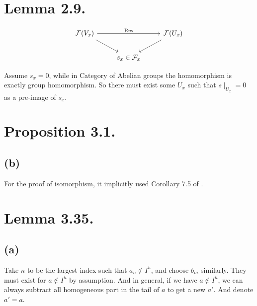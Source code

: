 \section{Lemma 2.9.}

\[\begin{tikzcd}
	{\mathcal F(V_x)} && {\mathcal F(U_x)} \\
	& {s_x\in\mathcal F_x}
	\arrow["{\text{Res}}", from=1-1, to=1-3]
	\arrow[from=1-1, to=2-2]
	\arrow[from=1-3, to=2-2]
\end{tikzcd}\]

Assume $s_x=0$, while in Category of Abelian groups the homomorphism is exactly group homomorphism. So there must exist some $U_x$ such that $s\mid_{U_x}=0$ as a pre-image of $s_x$.

\section{Proposition 3.1.}

\subsection{(b)}

For the proof of isomorphism, it implicitly used Corollary 7.5 of \cite{atiyah1994introduction}.

\section{Lemma 3.35.}

\subsection{(a)}

Take $n$ to be the largest index such that $a_n\notin I^h$, and choose $b_m$ similarly. They must exist for $a\notin I^h$ by assumption.
And in general, if we have $a\notin I^h$, we can always subtract all homogeneous part in the tail of $a$ to get a new $a'$. And denote $a'=a$.
